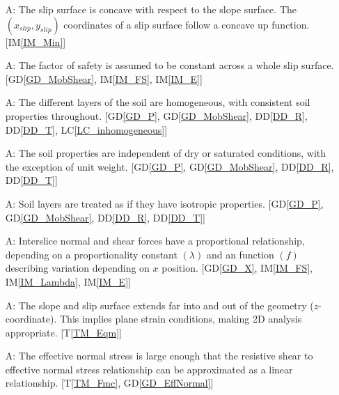 \documentclass[12pt]{article}
\newcounter{assumpnum} %
\newcommand{\tref}[1]{T\ref{#1}}
\newcommand{\iref}[1]{IM\ref{#1}}
\newcommand{\ddref}[1]{DD\ref{#1}}
\newcommand{\dref}[1]{GD\ref{#1}}
\newcommand{\lcref}[1]{LC\ref{#1}}
\begin{document}
\begin{enumerate}[label=A\arabic*:,ref={\arabic*}]
\item [A\refstepcounter{assumpnum}\theassumpnum: \label{A_Concave}] The
  slip surface is concave with respect to the slope surface. The 
  $(x_{slip},y_{slip})$ coordinates of a slip surface follow a concave up 
  function. [\iref{IM_Min}]

\item [A\refstepcounter{assumpnum}\theassumpnum: \label{A_Constant}] The factor 
of safety is assumed to be constant across a whole slip surface. 
[\dref{GD_MobShear}, \iref{IM_FS}, \iref{IM_E}]

\item [A\refstepcounter{assumpnum}\theassumpnum: \label{A_Homo}] The
  different layers of the soil are homogeneous, with consistent soil
  properties throughout. [\dref{GD_P}, \dref{GD_MobShear}, \ddref{DD_R}, 
  \ddref{DD_T}, \lcref{LC_inhomogeneous}]
  
\item [A\refstepcounter{assumpnum}\theassumpnum: \label{A_Saturated}] The soil 
properties are independent of dry or saturated conditions, with the exception 
of unit weight. [\dref{GD_P}, \dref{GD_MobShear}, \ddref{DD_R}, 
\ddref{DD_T}]

\item [A\refstepcounter{assumpnum}\theassumpnum: \label{A_Isotropic}]
  Soil layers are treated as if they have isotropic properties. [\dref{GD_P}, 
  \dref{GD_MobShear}, \ddref{DD_R}, \ddref{DD_T}]
  
\item [A\refstepcounter{assumpnum}\theassumpnum: \label{A_Base}]
  Interslice normal and shear forces have a proportional relationship,
  depending on a proportionality constant $\left({\lambda}\right)$ and an
  function $\left({f}\right)$ describing variation depending on $x$
  position. [\dref{GD_X}, \iref{IM_FS}, \iref{IM_Lambda}, \iref{IM_E}]
  
\item [A\refstepcounter{assumpnum}\theassumpnum: \label{A_2D}] The
  slope and slip surface extends far into and out of the geometry 
  ($z$-coordinate). This implies plane strain conditions, making 2D
  analysis appropriate. [\tref{TM_Eqm}]

\item [A\refstepcounter{assumpnum}\theassumpnum: \label{A_Lin}] The
  effective normal stress is large enough that the resistive shear to
  effective normal stress relationship can be approximated as a linear
  relationship. [\tref{TM_Fmc}, \dref{GD_EffNormal}]


\end{enumerate}
\end{document}
